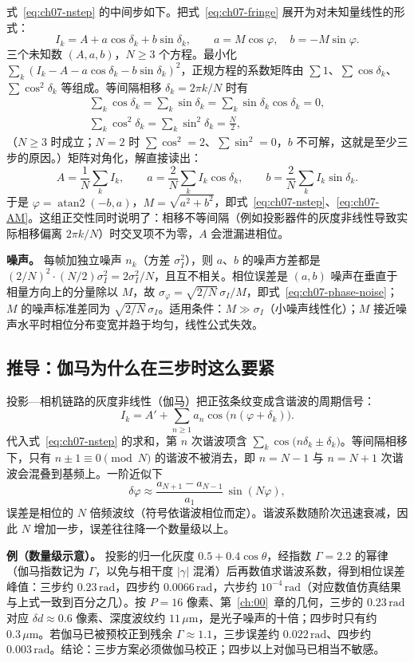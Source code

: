 式~\eqref{eq:ch07-nstep} 的中间步如下。把式~\eqref{eq:ch07-fringe} 展开为对未知量线性的形式：
\[
  I_k=A+a\cos\delta_k+b\sin\delta_k,\qquad a=M\cos\varphi,\quad b=-M\sin\varphi .
\]
三个未知数 $(A,a,b)$，$N\ge3$ 个方程。最小化 $\sum_k(I_k-A-a\cos\delta_k-b\sin\delta_k)^2$，正规方程的系数矩阵由 $\sum1$、$\sum\cos\delta_k$、$\sum\cos^2\delta_k$ 等组成。等间隔相移 $\delta_k=2\pi k/N$ 时有
\begin{gather*}
  \sum_k\cos\delta_k=\sum_k\sin\delta_k=\sum_k\sin\delta_k\cos\delta_k=0,\\
  \sum_k\cos^2\delta_k=\sum_k\sin^2\delta_k=\frac N2 ,
\end{gather*}
（$N\ge3$ 时成立；$N=2$ 时 $\sum\cos^2=2$、$\sum\sin^2=0$，$b$ 不可解，这就是至少三步的原因。）矩阵对角化，解直接读出：
\[
  A=\frac1N\sum_kI_k,\qquad a=\frac2N\sum_kI_k\cos\delta_k,\qquad b=\frac2N\sum_kI_k\sin\delta_k .
\]
于是 $\varphi=\operatorname{atan2}(-b,a)$，$M=\sqrt{a^2+b^2}$，即式~\eqref{eq:ch07-nstep}、\eqref{eq:ch07-AM}。这组正交性同时说明了：相移不等间隔（例如投影器件的灰度非线性导致实际相移偏离 $2\pi k/N$）时交叉项不为零，$A$ 会泄漏进相位。

\textbf{噪声。} 每帧加独立噪声 $n_k$（方差 $\sigma_I^2$），则 $a$、$b$ 的噪声方差都是 $(2/N)^2\cdot(N/2)\sigma_I^2=2\sigma_I^2/N$，且互不相关。相位误差是 $(a,b)$ 噪声在垂直于相量方向上的分量除以 $M$，故 $\sigma_\varphi=\sqrt{2/N}\,\sigma_I/M$，即式~\eqref{eq:ch07-phase-noise}；$M$ 的噪声标准差同为 $\sqrt{2/N}\,\sigma_I$。适用条件：$M\gg\sigma_I$（小噪声线性化）；$M$ 接近噪声水平时相位分布变宽并趋于均匀，线性公式失效。

\subsection{推导：伽马为什么在三步时这么要紧}

投影—相机链路的灰度非线性（伽马）把正弦条纹变成含谐波的周期信号：
\[
  I_k=A'+\sum_{n\ge1}a_n\cos\bigl(n(\varphi+\delta_k)\bigr).
\]
代入式~\eqref{eq:ch07-nstep} 的求和，第 $n$ 次谐波项含 $\sum_k\cos\bigl(n\delta_k\pm\delta_k\bigr)$。等间隔相移下，只有 $n\pm1\equiv0\pmod N$ 的谐波不被消去，即 $n=N-1$ 与 $n=N+1$ 次谐波会混叠到基频上。一阶近似下
\[
  \delta\varphi\approx\frac{a_{N+1}-a_{N-1}}{a_1}\,\sin(N\varphi),
\]
误差是相位的 $N$ 倍频波纹（符号依谐波相位而定）。谐波系数随阶次迅速衰减，因此 $N$ 增加一步，误差往往降一个数量级以上。

\textbf{例（数量级示意）。} 投影的归一化灰度 $0.5+0.4\cos\theta$，经指数 $\Gamma=2.2$ 的幂律（伽马指数记为 $\Gamma$，以免与相干度 $|\gamma|$ 混淆）后再数值求谐波系数，得到相位误差峰值：三步约 $0.23\,\mathrm{rad}$，四步约 $0.0066\,\mathrm{rad}$，六步约 $10^{-4}\,\mathrm{rad}$（对应数值仿真结果与上式一致到百分之几）。按 $P=16$ 像素、第~\ref{ch:00}~章的几何，三步的 $0.23\,\mathrm{rad}$ 对应 $\delta d\approx0.6$ 像素、深度波纹约 $11\,\mu\mathrm{m}$，是光子噪声的十倍；四步时只有约 $0.3\,\mu\mathrm{m}$。若伽马已被预校正到残余 $\Gamma\approx1.1$，三步误差约 $0.022\,\mathrm{rad}$、四步约 $0.003\,\mathrm{rad}$。结论：三步方案必须做伽马校正；四步以上对伽马已相当不敏感。

